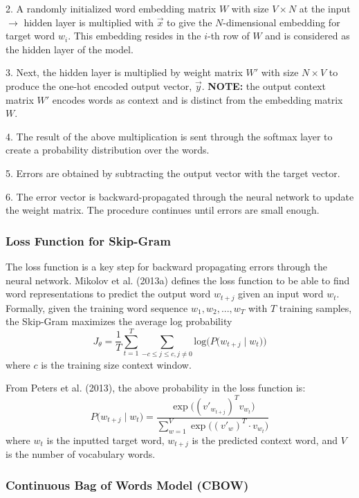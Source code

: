 2. A randomly initialized word embedding matrix $W$ with size $V \times N$ at the input $\rightarrow$ hidden layer is multiplied with $\overrightarrow{x}$ to give the $N$-dimensional embedding for target word $w_i$. This embedding resides in the $i$-th row of $W$ and is considered as the hidden layer of the model. 

3. Next, the hidden layer is multiplied by weight matrix $W'$ with size $N \times V$ to produce the one-hot encoded output vector, $\overrightarrow{y}$. \textbf{NOTE: }the output context matrix $W'$ encodes words as context and is distinct from the embedding matrix $W$. 

4. The result of the above multiplication is sent through the softmax layer to create a probability distribution over the words. 

5. Errors are obtained by subtracting the output vector with the target vector. 

6. The error vector is backward-propagated through the neural network to update the weight matrix. The procedure continues until errors are small enough. 

\subsubsection{Loss Function for Skip-Gram}

The loss function is a key step for backward propagating errors through the neural network. Mikolov et al. (2013a) defines the loss function to be able to find word representations to predict the output word $w_{t+j}$ given an input word $w_t$. Formally, given the training word sequence $w_1, w_2, ..., w_T$ with $T$ training samples, the Skip-Gram maximizes the average log probability
$$
J_\theta = \frac{1}{T} \sum_{t=1}^T \sum_{-c \leq j \leq c, j \neq 0} \text{log} \Big(P \Big(w_{t+j} \;| \; w_t \Big) \Big)
$$
where $c$ is the training size context window. 

From Peters et al. (2013), the above probability in the loss function is:
$$
P \Big( w_{t+j} \; | \; w_t \Big) = \frac {\exp{ \Big( (v'_{w_{t+j}})^T  v_{w_t} \Big) }} {\sum_{w=1}^V \exp{ \Big( (v'_w)^T \cdot v_{w_t} \Big) }}
$$
where $w_t$ is the inputted target word, $w_{t+j}$ is the predicted context word, and $V$ is the number of vocabulary words. 



\subsubsection{Continuous Bag of Words Model (CBOW)}

